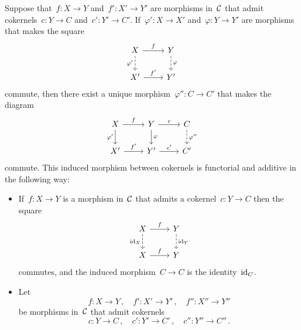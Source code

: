\begin{remark*}
\begin{enumerate}
      Suppose that~$f \colon X \to Y$ and~$f' \colon X' \to Y'$ are morphisms in~$\mathcal{C}$ that admit cokernels~$c \colon Y \to C$ and~$c' \colon Y' \to C'$.
      If~$\varphi' \colon X \to X'$ and~$\varphi \colon Y \to Y'$ are morphisms that makes the square
      \[
        \begin{tikzcd}
            X
            \arrow{r}[above]{f}
            \arrow[dashed]{d}[left]{\varphi'}
          & Y
            \arrow[dashed]{d}[right]{\varphi}
          \\
            X'
            \arrow{r}[above]{f'}
          & Y'
        \end{tikzcd}
      \]
      commute, then there exist a unique morphism~$\varphi'' \colon C \to C'$ that makes the diagram
      \[
        \begin{tikzcd}
            X
            \arrow{r}[above]{f}
            \arrow{d}[left]{\varphi'}
          & Y
            \arrow{r}[above]{c}
            \arrow{d}[right]{\varphi}
          & C
            \arrow[dashed]{d}[right]{\varphi''}
          \\
            X'
            \arrow{r}[above]{f'}
          & Y'
            \arrow{r}[above]{c'}
          & C'
        \end{tikzcd}
      \]
      commute.
      This induced morphism between cokernels is functorial and additive in the following way:
      \begin{itemize}
        \item
          If~$f \colon X \to Y$ is a morphism in~$\mathcal{C}$ that admits a cokernel~$c \colon Y \to C$ then the square
          \[
            \begin{tikzcd}
                X
                \arrow{r}[above]{f}
                \arrow[dashed]{d}[left]{\id_X}
              & Y
                \arrow[dashed]{d}[right]{\id_Y}
              \\
                X
                \arrow{r}[above]{f}
              & Y
            \end{tikzcd}
          \]
          commutes, and the induced morphism~$C \to C$ is the identity~$\operatorname{id}_C$.
        \item
          Let
          \[
            f \colon X \to Y \,,
            \quad
            f' \colon X' \to Y' \,,
            \quad
            f'' \colon X'' \to Y''
          \]
          be morphisms in~$\mathcal{C}$ that admit cokernels
          \[
            c \colon Y \to C \,,
            \quad
            c' \colon Y' \to C' \,,
            \quad
            c'' \colon Y'' \to C'' \,.
\]
\end{itemize}
\end{enumerate}
\end{remark*}

